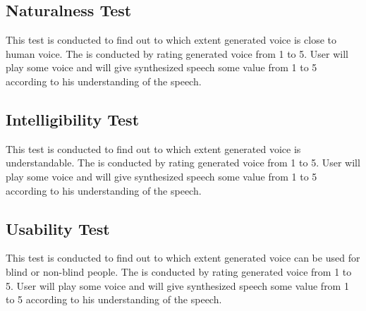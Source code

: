 \subsection{Naturalness Test}
This test is conducted to find out to which extent generated voice is close to human voice. The is conducted by rating generated voice from 1 to 5. User will play some voice and will give synthesized speech some value from 1 to 5 according to his understanding of the speech.

\subsection{Intelligibility Test}
This test is conducted to find out to which extent generated voice is understandable. The is conducted by rating generated voice from 1 to 5. User will play some voice and will give synthesized speech some value from 1 to 5 according to his understanding of the speech.

\subsection{Usability Test}
This test is conducted to find out to which extent generated voice can be used for blind or non-blind people. The is conducted by rating generated voice from 1 to 5. User will play some voice and will give synthesized speech some value from 1 to 5 according to his understanding of the speech.
